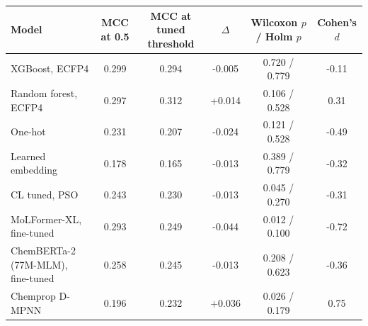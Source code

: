 \begin{tabular}{lccccc}
\toprule
Model & MCC at 0.5 & MCC at tuned threshold & $\Delta$ & Wilcoxon $p$ / Holm $p$ & Cohen's $d$ \\
\midrule
XGBoost, ECFP4 & 0.299 & 0.294 & -0.005 & 0.720 / 0.779 & -0.11 \\
Random forest, ECFP4 & 0.297 & 0.312 & +0.014 & 0.106 / 0.528 & 0.31 \\
One-hot & 0.231 & 0.207 & -0.024 & 0.121 / 0.528 & -0.49 \\
Learned embedding & 0.178 & 0.165 & -0.013 & 0.389 / 0.779 & -0.32 \\
CL tuned, PSO & 0.243 & 0.230 & -0.013 & 0.045 / 0.270 & -0.31 \\
MoLFormer-XL, fine-tuned & 0.293 & 0.249 & -0.044 & 0.012 / 0.100 & -0.72 \\
ChemBERTa-2 (77M-MLM), fine-tuned & 0.258 & 0.245 & -0.013 & 0.208 / 0.623 & -0.36 \\
Chemprop D-MPNN & 0.196 & 0.232 & +0.036 & 0.026 / 0.179 & 0.75 \\
\bottomrule
\end{tabular}